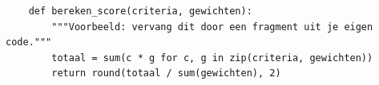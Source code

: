 \begin{listing}[htbp]
  \begin{verbatim}
    def bereken_score(criteria, gewichten):
        """Voorbeeld: vervang dit door een fragment uit je eigen code."""
        totaal = sum(c * g for c, g in zip(criteria, gewichten))
        return round(totaal / sum(gewichten), 2)
  \end{verbatim}
  \caption[Voorbeeld van een codefragment]{\label{lst:voorbeeld}%
    Vervang dit fragment door een stuk van je eigen code, en leg in de tekst
    uit wat het doet en waarom het zo opgelost is. Neem nooit hele bestanden
    op: kies het fragment dat iets uitlegt.}
\end{listing}


\section{}%
\label{sec:problemen}


